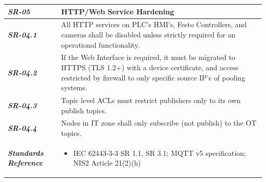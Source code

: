 \documentclass{report}
\begin{document}
\begin{tabularx}{\textwidth}{>{\bfseries}p{2.5cm} X}
    \textit{SR-05} & \textbf{HTTP/Web Service Hardening} \vspace{0.5em}\\
\toprule
\textit{SR-04.1} &

    All HTTP services on PLC's HMI's, Festo Controllers, and cameras shall be disabled unless strictly required for an operational functionality.
    \vspace{0.5em}
\\
\textit{SR-04.2} &
    If the Web Interface is required, it must be migrated to HTTPS (TLS 1.2+) with a device certificate, and access restricted by firewall to only specific source
    IP's of pooling systems.
    \vspace{0.5em}
    \\
\textit{SR-04.3} &
    Topic level ACLs must restrict publishers only to its own publish topics.
    \vspace{0.5em}
    \\
\textit{SR-04.4} &
    Nodes in IT zone shall only subscribe (not publish) to the OT topics.
    \vspace{0.5em}
    \\
\midrule
    \textit{Standards Reference} &
\begin{itemize}[label=-, noitemsep, topsep=0pt, leftmargin=*]
    \item IEC 62443-3-3 SR 1.1, SR 3.1; MQTT v5 specification; NIS2 Article 21(2)(h)
\end{itemize} \vspace{1em} \\ 
\end{tabularx}
\vspace{2em}

\end{document}
